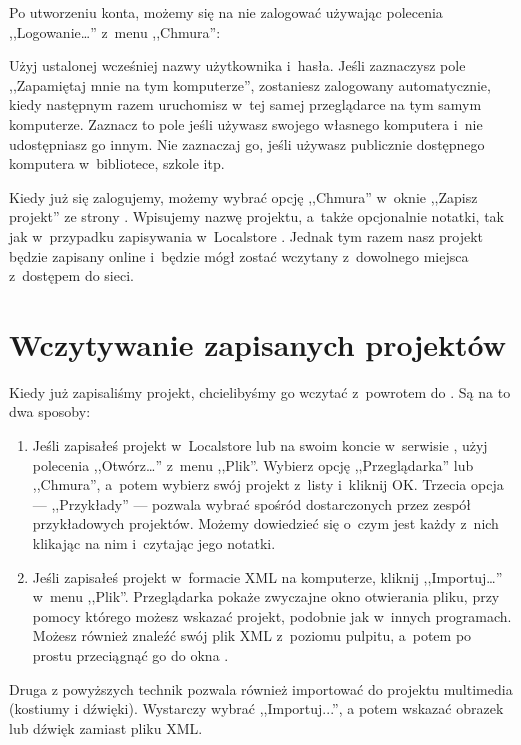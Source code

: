 \documentclass[a4paper]{report}
\begin{document}
Po utworzeniu konta, możemy się na nie zalogować używając polecenia ,,Logowanie\ldots'' z~menu ,,Chmura'':\nopagebreak


Użyj ustalonej wcześniej nazwy użytkownika i~hasła. Jeśli zaznaczysz pole ,,Zapamiętaj mnie na tym komputerze'', zostaniesz zalogowany automatycznie, kiedy następnym razem uruchomisz  w~tej samej przeglądarce na tym samym komputerze. Zaznacz to pole jeśli używasz swojego własnego komputera i~nie udostępniasz go innym. Nie zaznaczaj go, jeśli używasz publicznie dostępnego komputera w~bibliotece, szkole itp.

Kiedy już się zalogujemy, możemy wybrać opcję ,,Chmura'' w~oknie ,,Zapisz projekt'' ze strony . Wpisujemy nazwę projektu, a~także opcjonalnie notatki, tak jak w~przypadku zapisywania w~Localstore . Jednak tym razem nasz projekt będzie zapisany online i~będzie mógł zostać wczytany z~dowolnego miejsca z~dostępem do sieci.

\section{Wczytywanie zapisanych projektów}

Kiedy już zapisaliśmy projekt, chcielibyśmy go wczytać z~powrotem do . Są na to dwa sposoby:

\begin{enumerate}
\item Jeśli zapisałeś projekt w~Localstore  lub na swoim koncie w~serwisie \Snap{}, użyj polecenia ,,Otwórz\ldots'' z~menu ,,Plik''. Wybierz opcję ,,Przeglądarka'' lub ,,Chmura'', a~potem wybierz swój projekt z~listy i~kliknij OK. Trzecia opcja --- ,,Przykłady'' --- pozwala wybrać spośród dostarczonych przez zespół  przykładowych projektów. Możemy dowiedzieć się o~czym jest każdy z~nich klikając na nim i~czytając jego notatki.

\item Jeśli zapisałeś projekt w~formacie XML na komputerze, kliknij ,,Importuj\ldots'' w~menu ,,Plik''. Przeglądarka pokaże zwyczajne okno otwierania pliku, przy pomocy którego możesz wskazać projekt, podobnie jak w~innych programach. Możesz również znaleźć swój plik XML z~poziomu pulpitu, a~potem po prostu przeciągnąć go do okna .
\end{enumerate}

Druga z powyższych technik pozwala również importować do projektu multimedia (kostiumy i dźwięki). Wystarczy wybrać ,,Importuj...'', a potem wskazać obrazek lub dźwięk zamiast pliku XML.
\end{document}
